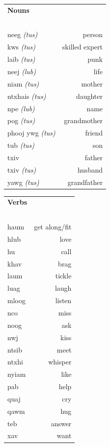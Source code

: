 \documentclass{article}
\begin{document}
\begin{multicols}{2}
[
\section*{}
\begin{center}\rule{\textwidth}{.4pt}\end{center}
]

\begin{tabular}{l r}
\textbf{Nouns} \\
~\\
neeg {\em (tus)} &person\\
kws {\em (tus)} &skilled expert\\
laib {\em (tus)} &punk\\
neej {\em (lub)} &life\\
niam {\em (tus)} &mother\\
ntxhais {\em (tus)} &daughter\\
npe {\em (lub)} &name\\
pog {\em (tus)} &grandmother\\
phooj ywg {\em (tus)} &friend\\
tub {\em (tus)} &son\\
txiv &father\\
txiv {\em (tus)} &husband\\
yawg {\em (tus)} &grandfather\\
\end{tabular}

\begin{tabular}{l r}
\textbf{Verbs} \\
~\\
haum &get along/fit\\
hlub &love\\
hu &call\\
khav &brag\\
laum &tickle\\
luag &laugh\\
mloog &listen\\
nco &miss\\
noog &ask\\
nwj &kiss\\
ntsib &meet\\
ntxhi &whisper\\
nyiam &like\\
pab &help\\
quaj &cry\\
qawm &hug\\
teb &answer\\
xav &want\\
\end{tabular}

\end{multicols}
\end{document}
